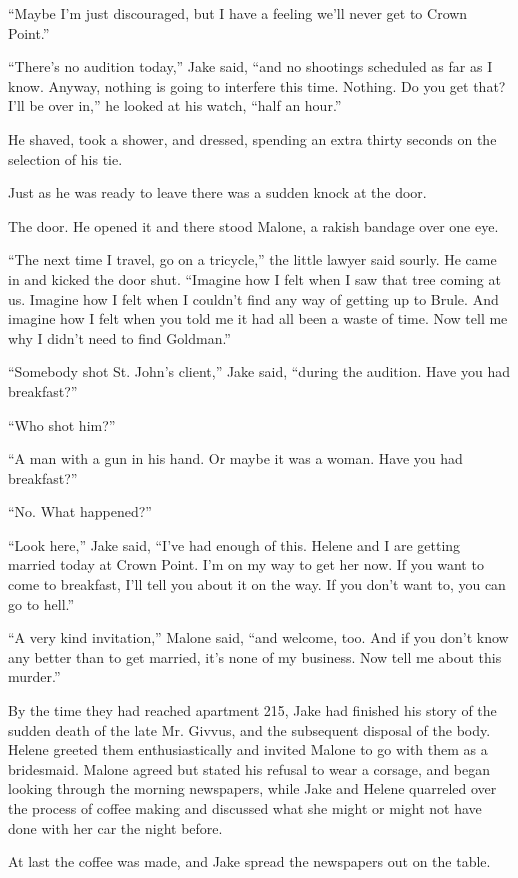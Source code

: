 \documentclass{novel}
\begin{document}
“Maybe I’m just discouraged, but I have a feeling we’ll never get to Crown Point.”

“There’s no audition today,” Jake said, “and no shootings scheduled as far as I know. Anyway, nothing is going to interfere this time. Nothing. Do you get that? I’ll be over in,” he looked at his watch, “half an hour.”

He shaved, took a shower, and dressed, spending an extra thirty seconds on the selection of his tie.

Just as he was ready to leave there was a sudden knock at the door.

The door. He opened it and there stood Malone, a rakish bandage over one eye.

“The next time I travel, go on a tricycle,” the little lawyer said sourly. He came in and kicked the door shut. “Imagine how I felt when I saw that tree coming at us. Imagine how I felt when I couldn’t find any way of getting up to Brule. And imagine how I felt when you told me it had all been a waste of time. Now tell me why I didn’t need to find Goldman.”

“Somebody shot St. John’s client,” Jake said, “during the audition. Have you had breakfast?”

“Who shot him?”

“A man with a gun in his hand. Or maybe it was a woman. Have you had breakfast?”

“No. What happened?”

“Look here,” Jake said, “I’ve had enough of this. Helene and I are getting married today at Crown Point. I’m on my way to get her now. If you want to come to breakfast, I'll tell you about it on the way. If you don’t want to, you can go to hell.”

“A very kind invitation,” Malone said, “and welcome, too. And if you don’t know any better than to get married, it’s none of my business. Now tell me about this murder.”

By the time they had reached apartment 215, Jake had finished his story of the sudden death of the late Mr. Givvus, and the subsequent disposal of the body. Helene greeted them enthusiastically and invited Malone to go with them as a bridesmaid. Malone agreed but stated his refusal to wear a corsage, and began looking through the morning newspapers, while Jake and Helene quarreled over the process of coffee making and discussed what she might or might not have done with her car the night before.

At last the coffee was made, and Jake spread the newspapers out on the table.
\end{document}
